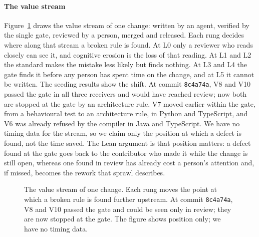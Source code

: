 \paragraph{The value stream} Figure~\ref{fig:valuestream} draws the value stream of one change:
written by an agent, verified by the single gate, reviewed by a person, merged and released. Each
rung decides where along that stream a broken rule is found. At L0 only a reviewer who reads
closely can see it, and cognitive erosion is the loss of that reading. At L1 and L2 the
standard makes the mistake less likely but finds nothing. At L3 and L4 the gate finds it before
any person has spent time on the change, and at L5 it cannot be written. The seeding results show
the shift. At commit \texttt{8c4a74a}, V8 and V10 passed the gate in all three receivers and would
have reached review; now both are stopped at the gate by an architecture rule. V7 moved earlier
within the gate, from a behavioural test to an architecture rule, in Python and TypeScript, and V6
was already refused by the compiler in Java and TypeScript. We have no timing data for the stream, so we claim
only the position at which a defect is found, not the time saved. The Lean argument is that
position matters: a defect found at the gate goes back to the contributor who made it while the
change is still open, whereas one found in review has already cost a person's attention and, if
missed, becomes the rework that sprawl describes.

\begin{figure}[t]
  \centering
  \resizebox{0.92\linewidth}{!}{}
  \caption{The value stream of one change. Each rung moves the point at which a broken rule is
  found further upstream. At commit \texttt{8c4a74a}, V8 and V10 passed the gate and could be seen
  only in review; they are now stopped at the gate. The figure shows position only; we have no
  timing data.}
  \label{fig:valuestream}
\end{figure}

